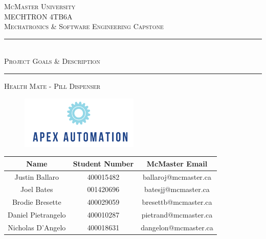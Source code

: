 \documentclass[12pt,titlepage]{article}
\begin{document}
\begin{titlepage}

\newcommand{\HRule}{\rule{\linewidth}{0.5mm}} %

\center %
 

\textsc{\LARGE McMaster University}\\[1.5cm] %
\textsc{\Large MECHTRON 4TB6A}\\[0.5cm] %
\textsc{\large Mechatronics \& Software Engineering Capstone}\\[0.5cm] %

\vspace{1cm}
\HRule \\[0.2cm]
{ \Large \vspace{0.25cm}  \textsc{  \LARGE Project Goals \& Description} \vspace{0.3cm} }  %
\HRule \vspace{1cm}

\textsc{\LARGE Health Mate - Pill Dispenser}
 
 \begin{figure}[h]
  \centering
  \includegraphics[width=.4\linewidth]{../ApexEngineering.png}
\end{figure}
 \vspace{1cm}
 

\begin{table}[ht!]
\centering
\begin{tabular}{c c c}
\toprule
\textbf{Name} & \textbf{Student Number} & \textbf{McMaster Email}         \\ \midrule
Justin Ballaro & 400015482 & ballaroj@mcmaster.ca \\
Joel Bates & 001420696 & batesjj@mcmaster.ca \\
Brodie Bresette & 400029059 & bresettb@mcmaster.ca \\
Daniel Pietrangelo & 400010287 &  pietrand@mcmaster.ca \\
Nicholas D'Angelo & 400018631 &  dangelon@mcmaster.ca  \\
  \bottomrule
\end{tabular}
\label{Tab:HU}
\end{table}


\end{titlepage}
\end{document}
